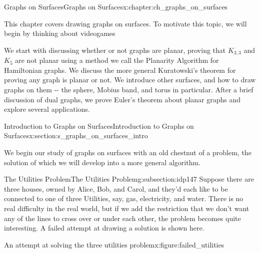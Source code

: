 \documentclass[oneside,10pt,]{book}
\numberwithin{equation}{section}
\begin{document}
%
%
\typeout{************************************************}
\typeout{************************************************}
%
\begin{chapterptx}{Graphs on Surfaces}{}{Graphs on Surfaces}{}{}{x:chapter:ch_graphs_on_surfaces}
\begin{introduction}{}%
This chapter covers drawing graphs on surfaces. To motivate this topic, we will begin by thinking about videogames%
\par
We start with discussing whether or not graphs are planar, proving that \(K_{3,3}\) and \(K_5\) are not planar using a method we call the Planarity Algorithm for Hamiltonian graphs.  We discuss the more general Kuratowski's theorem for proving any graph is planar or not.  We introduce other surfaces, and how to draw graphs on them -{}-{} the sphere, Mobius band, and torus in particular.  After a brief discussion of dual graphs, we prove Euler's theorem about planar graphs and explore several applications.%
\end{introduction}%
%
%
\typeout{************************************************}
\typeout{************************************************}
%
\begin{sectionptx}{Introduction to Graphs on Surfaces}{}{Introduction to Graphs on Surfaces}{}{}{x:section:s_graphs_on_surfaces_intro}
\begin{introduction}{}%
We begin our study of graphs on surfaces with an old chestnut of a problem, the solution of which we will develop into a more general algorithm.%
\end{introduction}%
%
%
\typeout{************************************************}
\typeout{************************************************}
%
\begin{subsectionptx}{The Utilities Problem}{}{The Utilities Problem}{}{}{g:subsection:idp147}
Suppose there are three houses, owned by Alice, Bob, and Carol, and they'd each like to be connected to one of three Utilities, say, gas, electricity, and water.  There is no real difficulty in the real world, but if we add the restriction that we don't want any of the lines to cross over or under each other, the problem becomes quite interesting.  A failed attempt at drawing a solution is shown here.%
\begin{figureptx}{An attempt at solving the three utilities problem}{x:figure:failed_utilities}{}%
\begin{image}{0.15}{0.7}{0.15}%

\end{image}
\end{figureptx}
\end{subsectionptx}
\end{sectionptx}
\end{chapterptx}
\end{document}
